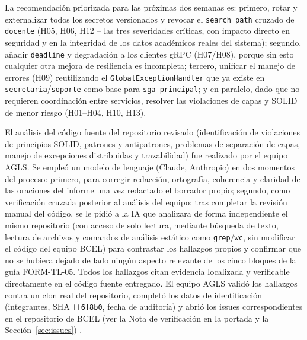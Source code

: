\documentclass[11pt,a4paper]{article}
\begin{document}
La recomendaci\'on priorizada para las pr\'oximas dos semanas es: primero, rotar y externalizar todos los secretos versionados y revocar el \texttt{search\_path} cruzado de \texttt{docente} (H05, H06, H12 -- las tres severidades cr\'iticas, con impacto directo en seguridad y en la integridad de los datos acad\'emicos reales del sistema); segundo, a\~nadir \texttt{deadline} y degradaci\'on a los clientes gRPC (H07/H08), porque sin esto cualquier otra mejora de resiliencia es incompleta; tercero, unificar el manejo de errores (H09) reutilizando el \texttt{GlobalExceptionHandler} que ya existe en \texttt{secretaria}/\texttt{soporte} como base para \texttt{sga-principal}; y en paralelo, dado que no requieren coordinaci\'on entre servicios, resolver las violaciones de capas y SOLID de menor riesgo (H01--H04, H10, H13).
    \begin{notebox}[title=Declaraci\'on de uso de inteligencia artificial generativa]
        El an\'alisis del c\'odigo fuente del repositorio revisado (identificaci\'on de violaciones de principios SOLID, patrones y antipatrones, problemas de separaci\'on de capas, manejo de excepciones distribuidas y trazabilidad) fue realizado por el equipo AGLS. Se emple\'o un modelo de lenguaje (Claude, Anthropic) en dos momentos del proceso: primero, para corregir redacci\'on, ortograf\'ia, coherencia y claridad de las oraciones del informe una vez redactado el borrador propio; segundo, como verificaci\'on cruzada posterior al an\'alisis del equipo: tras completar la revisi\'on manual del c\'odigo, se le pidi\'o a la IA que analizara de forma independiente el mismo repositorio (con acceso de solo lectura, mediante b\'usqueda de texto, lectura de archivos y comandos de an\'alisis est\'atico como \texttt{grep}/\texttt{wc}, sin modificar el c\'odigo del equipo BCEL) para contrastar los hallazgos propios y confirmar que no se hubiera dejado de lado ning\'un aspecto relevante de los cinco bloques de la gu\'ia FORM-TL-05. Todos los hallazgos citan evidencia localizada y verificable directamente en el c\'odigo fuente entregado. El equipo AGLS valid\'o los hallazgos contra un clon real del repositorio, complet\'o los datos de identificaci\'on (integrantes, SHA \texttt{ff6f8b0}, fecha de auditor\'ia) y abri\'o los issues correspondientes en el repositorio de BCEL (ver la Nota de verificaci\'on en la portada y la Secci\'on~\ref{sec:issues}) .
    \end{notebox}

    \clearpage
    \printbibliography[title={Referencias}]
\end{document}
